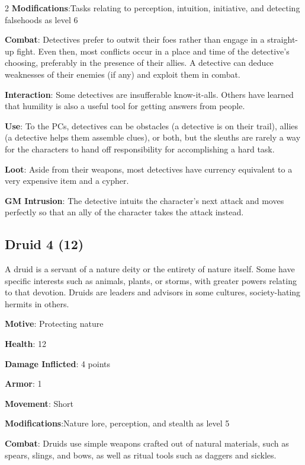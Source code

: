 \begin{multicols}{2}
\textbf{Modifications}:Tasks relating to perception, intuition, initiative, and detecting falsehoods as level 6

\textbf{Combat}: Detectives prefer to outwit their foes rather than engage in a straight-up fight. Even then, most conflicts occur in a place and time of the detective’s choosing, preferably in the presence of their allies. A detective can deduce weaknesses of their enemies (if any) and exploit them in combat.

\textbf{Interaction}: Some detectives are insufferable
know-it-alls. Others have learned that humility is also a useful tool for getting answers from people.

\textbf{Use}: To the PCs, detectives can be obstacles (a detective is on their trail), allies (a detective helps them assemble clues), or both, but the sleuths are rarely a way for the characters to hand off responsibility for accomplishing a hard task.

\textbf{Loot}: Aside from their weapons, most detectives have currency equivalent to a very expensive item and a cypher.

\textbf{GM Intrusion}: The detective intuits the character’s next attack and moves perfectly so that an ally of the character takes the attack instead.

\subsection{Druid 4 (12)}

A druid is a servant of a nature deity or the entirety of nature itself. Some have specific interests such as animals, plants, or storms, with greater powers relating to that devotion. Druids are leaders and advisors in some cultures, society-hating hermits in others. 

\textbf{Motive}: Protecting nature 

\textbf{Health}: 12 

\textbf{Damage Inflicted}: 4 points 

\textbf{Armor}: 1 

\textbf{Movement}: Short 

\textbf{Modifications}:Nature lore, perception, and stealth as level 5 

\textbf{Combat}: Druids use simple weapons crafted out of natural materials, such as spears, slings, and bows, as well as ritual tools such as daggers and sickles. 


\end{multicols}
